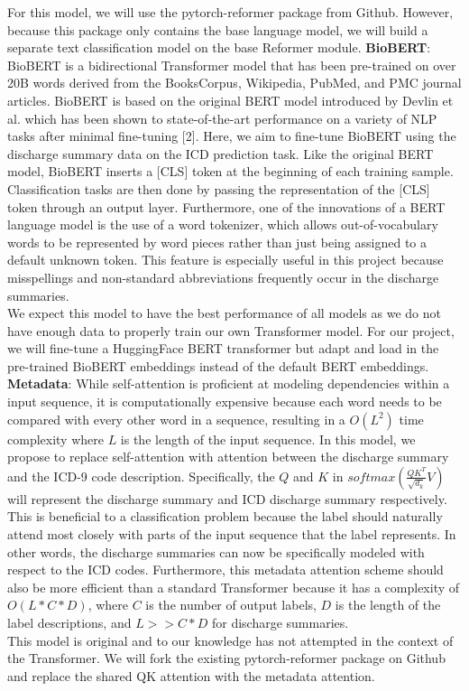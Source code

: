 \documentclass{article}
\begin{document}
\begin{itemize}
    		For this model, we will use the pytorch-reformer package from Github. However, because this package only contains the base language model, we will build a separate text classification model on the base Reformer module.
    		\textbf{BioBERT}: BioBERT is a bidirectional Transformer model that has been pre-trained on over 20B words derived from the BooksCorpus, Wikipedia, PubMed, and PMC journal articles. BioBERT is based on the original BERT model introduced by Devlin et al. which has been shown to state-of-the-art performance on a variety of NLP tasks after minimal fine-tuning [2]. Here, we aim to fine-tune BioBERT using the discharge summary data on the ICD prediction task. Like the original BERT model, BioBERT inserts a [CLS] token at the beginning of each training sample. Classification tasks are then done by passing the representation of the [CLS] token through an output layer. Furthermore, one of the innovations of a BERT language model is the use of a word tokenizer, which allows out-of-vocabulary words to be represented by word pieces rather than just being assigned to a default unknown token. This feature is especially useful in this project because misspellings and non-standard abbreviations frequently occur in the discharge summaries. \\
    		We expect this model to have the best performance of all models as we do not have enough data to properly train our own Transformer model. For our project, we will fine-tune a  HuggingFace BERT transformer but adapt and load in the pre-trained BioBERT embeddings instead of the default BERT embeddings. 
    		\textbf{Metadata}: While self-attention is proficient at modeling dependencies within a input sequence, it is computationally expensive because each word needs to be compared with every other word in a sequence, resulting in a $O(L^2)$ time complexity where $L$ is the length of the input sequence. In this model, we propose to replace self-attention with attention between the discharge summary and the ICD-9 code description. Specifically, the $Q$ and $K$ in $softmax(\frac{QK^T}{\sqrt{d_k}}V)$ will represent the discharge summary and ICD discharge summary respectively. \\
    		This is beneficial to a classification problem because the label should naturally attend most closely with parts of the input sequence that the label represents. In other words, the discharge summaries can now be specifically modeled with respect to the ICD codes. Furthermore, this metadata attention scheme should also be more efficient than a standard Transformer because it has a complexity of $O(L * C * D)$, where $C$ is the number of output labels, $D$ is the length of the label descriptions, and $L >> C * D$ for discharge summaries. \\
    		This model is original and to our knowledge has not attempted in the context of the Transformer. We will fork the existing pytorch-reformer package on Github and replace the shared QK attention with the metadata attention. 
    		

\end{itemize}
\end{document}
